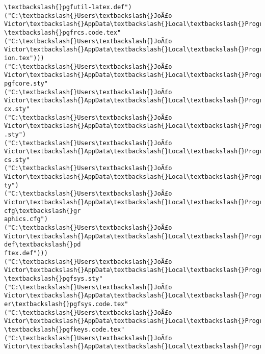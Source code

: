 \documentclass[11pt]{article}
\begin{document}
\begin{Verbatim}[commandchars=\\\{\}]
\textbackslash{}pgfutil-latex.def")
("C:\textbackslash{}Users\textbackslash{}JoÃ£o Victor\textbackslash{}AppData\textbackslash{}Local\textbackslash{}Programs\textbackslash{}MiKTeX\textbackslash{}tex/generic/pgf/utilities
\textbackslash{}pgfrcs.code.tex"
("C:\textbackslash{}Users\textbackslash{}JoÃ£o Victor\textbackslash{}AppData\textbackslash{}Local\textbackslash{}Programs\textbackslash{}MiKTeX\textbackslash{}tex/generic/pgf\textbackslash{}pgf.revis
ion.tex")))
("C:\textbackslash{}Users\textbackslash{}JoÃ£o Victor\textbackslash{}AppData\textbackslash{}Local\textbackslash{}Programs\textbackslash{}MiKTeX\textbackslash{}tex/latex/pgf/basiclayer\textbackslash{}
pgfcore.sty"
("C:\textbackslash{}Users\textbackslash{}JoÃ£o Victor\textbackslash{}AppData\textbackslash{}Local\textbackslash{}Programs\textbackslash{}MiKTeX\textbackslash{}tex/latex/graphics\textbackslash{}graphi
cx.sty"
("C:\textbackslash{}Users\textbackslash{}JoÃ£o Victor\textbackslash{}AppData\textbackslash{}Local\textbackslash{}Programs\textbackslash{}MiKTeX\textbackslash{}tex/latex/graphics\textbackslash{}keyval
.sty")
("C:\textbackslash{}Users\textbackslash{}JoÃ£o Victor\textbackslash{}AppData\textbackslash{}Local\textbackslash{}Programs\textbackslash{}MiKTeX\textbackslash{}tex/latex/graphics\textbackslash{}graphi
cs.sty"
("C:\textbackslash{}Users\textbackslash{}JoÃ£o Victor\textbackslash{}AppData\textbackslash{}Local\textbackslash{}Programs\textbackslash{}MiKTeX\textbackslash{}tex/latex/graphics\textbackslash{}trig.s
ty")
("C:\textbackslash{}Users\textbackslash{}JoÃ£o Victor\textbackslash{}AppData\textbackslash{}Local\textbackslash{}Programs\textbackslash{}MiKTeX\textbackslash{}tex/latex/graphics-cfg\textbackslash{}gr
aphics.cfg")
("C:\textbackslash{}Users\textbackslash{}JoÃ£o Victor\textbackslash{}AppData\textbackslash{}Local\textbackslash{}Programs\textbackslash{}MiKTeX\textbackslash{}tex/latex/graphics-def\textbackslash{}pd
ftex.def")))
("C:\textbackslash{}Users\textbackslash{}JoÃ£o Victor\textbackslash{}AppData\textbackslash{}Local\textbackslash{}Programs\textbackslash{}MiKTeX\textbackslash{}tex/latex/pgf/systemlayer
\textbackslash{}pgfsys.sty"
("C:\textbackslash{}Users\textbackslash{}JoÃ£o Victor\textbackslash{}AppData\textbackslash{}Local\textbackslash{}Programs\textbackslash{}MiKTeX\textbackslash{}tex/generic/pgf/systemlay
er\textbackslash{}pgfsys.code.tex"
("C:\textbackslash{}Users\textbackslash{}JoÃ£o Victor\textbackslash{}AppData\textbackslash{}Local\textbackslash{}Programs\textbackslash{}MiKTeX\textbackslash{}tex/generic/pgf/utilities
\textbackslash{}pgfkeys.code.tex"
("C:\textbackslash{}Users\textbackslash{}JoÃ£o Victor\textbackslash{}AppData\textbackslash{}Local\textbackslash{}Programs\textbackslash{}MiKTeX\textbackslash{}tex/generic/pgf/utilities

\end{Verbatim}
\end{document}
